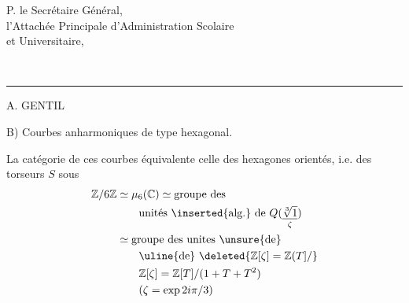 \begin{center}
P. le Secrétaire Général,\\
l'Attachée Principale d'Administration Scolaire\\
et Universitaire,

\\[-1ex]
\hspace*{2em}\rule{3em}{0.3pt}

A. GENTIL
\end{center}



B) Courbes  anharmoniques de type hexagonal.

La catégorie de ces courbes équivalente  celle des hexagones orientés, i.e. des torseurs $S$ sous
\[
\begin{aligned}
\mathbb Z/6\mathbb Z&\simeq\mu_6(\mathbb C)\simeq
\text{groupe des}\\
&\qquad\text{unités \inserted{alg.} de }Q(\underset{\zeta}{\underline{\sqrt[3]{1}}})\\
&\simeq\text{groupe des unites \unsure{de}}\\
&\qquad\text{\uline{de}}\ \deleted{\mathbb Z[\zeta]=\mathbb Z(T]/}\\
&\qquad\mathbb Z[\zeta]=\mathbb Z[T]/(1+T+T^2)\\
&\qquad(\zeta=\exp 2i\pi/3)
\end{aligned}
\]

